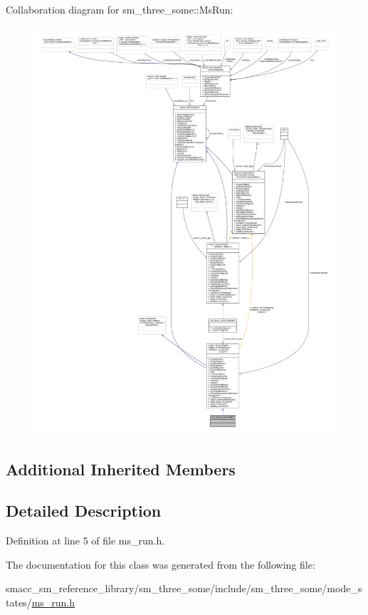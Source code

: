 Collaboration diagram for sm\+\_\+three\+\_\+some\+:\+:Ms\+Run\+:
\nopagebreak
\begin{figure}[H]
\begin{center}
\leavevmode
\includegraphics[width=350pt]{classsm__three__some_1_1MsRun__coll__graph}
\end{center}
\end{figure}
\subsection*{Additional Inherited Members}


\subsection{Detailed Description}


Definition at line 5 of file ms\+\_\+run.\+h.



The documentation for this class was generated from the following file\+:\begin{DoxyCompactItemize}
\item 
smacc\+\_\+sm\+\_\+reference\+\_\+library/sm\+\_\+three\+\_\+some/include/sm\+\_\+three\+\_\+some/mode\+\_\+states/\hyperlink{ms__run_8h}{ms\+\_\+run.\+h}\end{DoxyCompactItemize}
